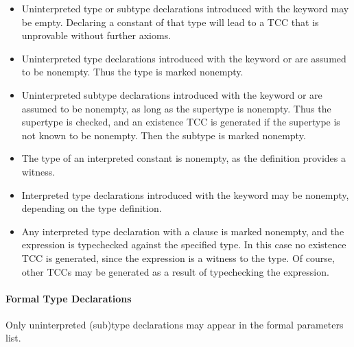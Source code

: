 \begin{itemize}

\item Uninterpreted type or subtype declarations introduced with the
keyword  may be empty.  Declaring a constant of that type
will lead to a TCC that is unprovable without further axioms.

\item Uninterpreted type declarations introduced with the keyword
or  are assumed to be nonempty.
Thus the type is marked nonempty.

\item Uninterpreted subtype declarations introduced with the keyword
 or  are assumed to be nonempty, as long as the
supertype is nonempty.  Thus the supertype is checked, and an existence
TCC is generated if the supertype is not known to be nonempty.  Then the
subtype is marked nonempty.

\item The type of an interpreted constant is nonempty, as the definition
provides a witness.

\item Interpreted type declarations introduced with the keyword
 may be non\-emp\-ty, depending on the type definition.

\item Any interpreted type declaration with a  clause
is marked nonempty, and the  expression is typechecked
against the specified type.  In this case no existence TCC is generated,
since the  expression is a witness to the type.  Of
course, other TCCs may be generated as a result of typechecking the
 expression.

\end{itemize}

\paragraph{Formal Type Declarations}

Only uninterpreted (sub)type declarations may appear in the formal
parameters list.

